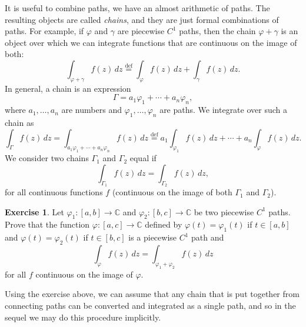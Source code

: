\documentclass[12pt,openany]{book}
\newcommand{\C}{{\mathbb{C}}}
\theoremstyle{plain}
\theoremstyle{remark}
\theoremstyle{definition}
\newenvironment{exbox}{%
    \def\FrameCommand{\vrule width 1pt \relax\hspace {10pt}}%
    \MakeFramed {\advance \hsize -\width \FrameRestore }%
}{%
    \endMakeFramed
}
\theoremstyle{exercise}
\newtheorem{exercise}{Exercise}[section]
\theoremstyle{example}
\begin{document}
It is useful to combine paths, we have an almost arithmetic of paths.
The resulting objects are called \emph{chains}, and they
are just formal combinations of paths.  For example, if $\varphi$
and $\gamma$ are piecewise $C^1$ paths, then the chain  $\varphi+\gamma$
is an object over which we can integrate functions that are continuous
on the image of both:
\begin{equation*}
\int_{\varphi + \gamma} f(z) \, dz
\overset{\text{def}}{=}
\int_{\varphi} f(z) \, dz +
\int_{\gamma} f(z) \, dz .
\end{equation*}
In general, a chain is an expression
\begin{equation*}
\Gamma = a_1 \varphi_1 + \cdots + a_n \varphi_n ,
\end{equation*}
where $a_1,\ldots,a_n$ are numbers and $\varphi_1,\ldots,\varphi_n$
are paths.  We integrate over such a chain as
\begin{equation*}
\int_{\Gamma} f(z) \, dz
=
\int_{a_1 \varphi_1 + \cdots + a_n \varphi_n} f(z) \, dz
\overset{\text{def}}{=}
a_1 \int_{\varphi_1} f(z) \, dz +
\cdots
+
a_n \int_{\varphi} f(z) \, dz .
\end{equation*}
We consider two chains $\Gamma_1$ and $\Gamma_2$ equal if
\begin{equation*}
\int_{\Gamma_1} f(z) \, dz = 
\int_{\Gamma_2} f(z) \, dz ,
\end{equation*}
for all continuous functions $f$ (continuous on the image of both $\Gamma_1$
and $\Gamma_2$).

\begin{exbox}
\begin{exercise}
Let $\varphi_1 \colon [a,b] \to \C$ and $\varphi_2 \colon [b,c] \to \C$
be two piecewise $C^1$ paths.  Prove that the function $\varphi \colon [a,c] \to
\C$ defined by $\varphi(t) = \varphi_1(t)$ if $t \in [a,b]$ and $\varphi(t)
= \varphi_2(t)$ if $t \in [b,c]$ is a piecewise $C^1$ path and
\begin{equation*}
\int_{\varphi} f(z)\,dz = \int_{\varphi_1 + \varphi_2} f(z) \, dz
\end{equation*}
for all $f$ continuous on the image of $\varphi$.
\end{exercise}
\end{exbox}

Using the exercise above, we can assume that any chain that is put together
from connecting paths can be converted and integrated as a single path,
and so in the sequel we may do this procedure implicitly.
\end{document}
